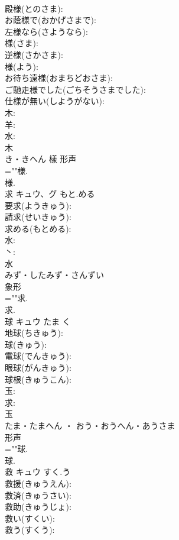 \documentclass[8pt]{extreport}
\begin{document}
\begin{CJK}{UTF8}{min}
\\	殿様(とのさま): 
\\	お蔭様で(おかげさまで): 
\\	左様なら(さようなら): 
\\	様(さま): 
\\	逆様(さかさま): 
\\	様(よう): 
\\	お待ち遠様(おまちどおさま): 
\\	ご馳走様でした(ごちそうさまでした): 
\\	仕様が無い(しようがない): 
\\	木: 
\\	羊: 
\\	水: 
\\	木	
\\	き・きへん	樣	形声 
\\	=""様.
\\	様.
\\	求	キュウ、グ	もと.める		
\\	要求(ようきゅう): 
\\	請求(せいきゅう): 
\\	求める(もとめる): 
\\	水: 
\\	丶: 
\\	水	
\\	みず・したみず・さんずい	
\\	象形 
\\	=""求.
\\	求.
\\	球	キュウ	たま	く	
\\	地球(ちきゅう): 
\\	球(きゅう): 
\\	電球(でんきゅう): 
\\	眼球(がんきゅう): 
\\	球根(きゅうこん): 
\\	玉: 
\\	求: 
\\	玉	
\\	たま・たまへん ・ おう・おうへん・あうさま	
\\	形声 
\\	=""球.
\\	球.
\\	救	キュウ	すく.う		
\\	救援(きゅうえん): 
\\	救済(きゅうさい): 
\\	救助(きゅうじょ): 
\\	救い(すくい): 
\\	救う(すくう): 

\end{CJK}
\end{document}
